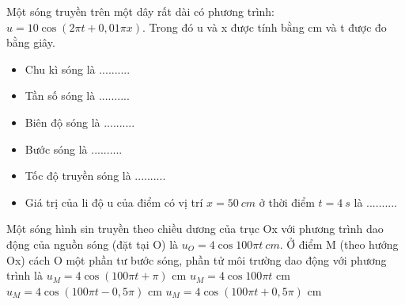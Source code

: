 \begin{vidu}%
Một sóng truyền trên một dây rất dài có phương trình: $u=10\cos(2\pi t+0,01\pi x)$. Trong đó u và x được tính bằng cm và t được đo bằng giây.
\begin{itemize}
\item[1,] Chu kì sóng là ..........
\item[2.] Tần số sóng là .......... 
\item[3.] Biên độ sóng là ..........
\item[4.] Bước sóng là ..........
\item[5.] Tốc độ truyền sóng là ..........
\item[6.] Giá trị của li độ u của điểm có vị trí $x=50\ cm$ ở thời điểm $t=4\ s$ là ..........
\end{itemize}
\end{vidu}
\begin{vidu}%
Một sóng hình sin truyền theo chiều dương của trục Ox với phương trình dao động của nguồn sóng (đặt tại O) là $u_O = 4\cos100\pi t\ cm$. Ở điểm M (theo hướng Ox) cách O một phần tư bước sóng, phần tử môi trường dao động với phương trình là
\choice
{$u_M = 4\cos(100\pi t + \pi)$ cm}
{$u_M = 4\cos100\pi t$ cm}
{\True $u_M = 4\cos(100\pi t - 0,5\pi )$ cm}
{$u_M = 4\cos(100\pi t + 0,5\pi)$ cm}
\end{vidu} %
